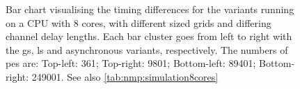 \begin{figure}
    \caption[Bar chart visualising the timing differences for the variants on an 8-core CPU]{Bar chart visualising the timing differences for the variants running on a CPU with 8 cores, with different sized grids and differing channel delay lengths.  Each bar cluster goes from left to right with the \gls{gs}, \gls{ls} and asynchronous variants, respectively.  The numbers of \glspl{pe} are:  Top-left: 361;  Top-right:  \num{9 801};  Bottom-left:  \num{89 401};  Bottom-right:  \num{249 001}.  See also \cref{tab:nmp:simulation8cores}}
    \label{fig:nmp:timings8cores}
\end{figure}


